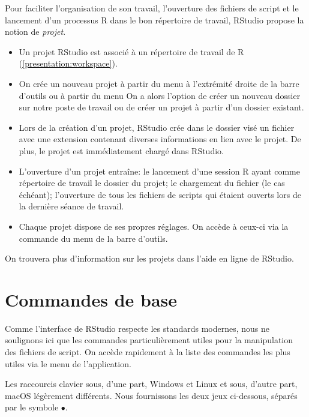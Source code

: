 Pour faciliter l'organisation de son travail, l'ouverture des fichiers
de script et le lancement d'un processus R dans le bon répertoire de
travail, RStudio propose la notion de \emph{projet}.
\begin{itemize}
\item Un projet RStudio est associé à un répertoire de travail de R
  (\autoref{presentation:workspace}).
\item On crée un nouveau projet à partir du menu  à
  l'extrémité droite de la barre d'outils ou à partir du menu
   On a alors l'option de créer un nouveau
  dossier sur notre poste de travail ou de créer un projet à partir
  d'un dossier existant.
\item Lors de la création d'un projet, RStudio crée dans le dossier
  visé un fichier avec une extension  contenant diverses
  informations en lien avec le projet. De plus, le projet est
  immédiatement chargé dans RStudio.
\item L'ouverture d'un projet entraîne: le lancement d'une session R
  ayant comme répertoire de travail le dossier du projet; le
  chargement du fichier  (le cas échéant); l'ouverture de
  tous les fichiers de scripts qui étaient ouverts lors de la dernière
  séance de travail.
\item Chaque projet dispose de ses propres réglages. On accède à
  ceux-ci via la commande  du menu
   de la barre d'outils.
\end{itemize}

On trouvera plus d'information sur les projets dans l'aide en ligne
de RStudio.



\section{Commandes de base}
\label{rstudio:commandes}

Comme l'interface de RStudio respecte les standards modernes, nous ne
soulignons ici que les commandes particulièrement utiles pour la
manipulation des fichiers de script. On accède rapidement à la liste
des commandes les plus utiles via le menu  de
l'application.

Les raccourcis clavier sous, d'une part, Windows et Linux et sous,
d'autre part, macOS légèrement différents. Nous fournissons les deux
jeux ci-dessous, séparés par le symbole $\bullet$.

